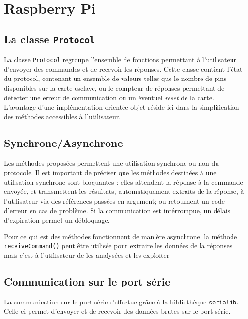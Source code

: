 \section{Raspberry Pi}
\subsection{La classe \texttt{Protocol}}

La classe \texttt{Protocol} regroupe l'ensemble de fonctions permettant à l'utilisateur d'envoyer des commandes et de recevoir les réponses. Cette classe contient l'état du protocol, contenant un ensemble de valeurs telles que le nombre de pins disponibles sur la carte esclave, ou le compteur de réponses permettant de détecter une erreur de communication ou un éventuel \emph{reset} de la carte. L'avantage d'une implémentation orientée objet réside ici dans la simplification des méthodes accessibles à l'utilisateur.

\subsection{Synchrone/Asynchrone}
Les méthodes proposées permettent une utilisation synchrone ou non du protocole.
Il est important de préciser que les méthodes destinées à une utilisation synchrone sont bloquantes : elles attendent la réponse à la commande envoyée, et transmettent les résultats, automatiquement extraits de la réponse, à l'utilisateur via des références passées en argument; ou retournent un code d'erreur en cas de problème. Si la communication est intérrompue, un délais d'expiration permet un débloquage.

Pour ce qui est des méthodes fonctionnant de manière asynchrone, la méthode \texttt{receiveCommand()} peut être utilisée pour extraire les données de la réponses mais c'est à l'utilisateur de les analysées et les exploiter.


\subsection{Communication sur le port série}
La communication sur le port série s'effectue grâce à la bibliothèque \texttt{serialib}. Celle-ci permet d'envoyer et de recevoir des données brutes sur le port série.
 
